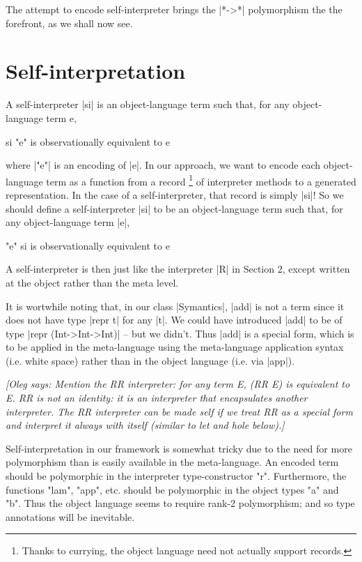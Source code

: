 \documentclass[preprint]{sigplanconf}
\newcommand{\oleg}[1]{{\it [Oleg says: #1]}}
\begin{document}
The attempt to encode self-interpreter brings the |*->*| polymorphism
the the forefront, as we shall now see.

\section{Self-interpretation}\label{selfinterp}

A self-interpreter |si| is an
object-language term such that, for any object-language term e,

\begin{code}
  si "e"    is observationally equivalent to    e
\end{code}

where |"e"| is an encoding of |e|.  In our approach, we want to encode
each object-language term as a function from a record%
\footnote{Thanks to currying, the object language need not actually support
records.}  of interpreter methods to a generated representation.  
In the case of a self-interpreter, that
record is simply |si|!  So we should define a self-interpreter |si| to be an
object-language term such that, for any object-language term |e|,

\begin{code}
  "e" si    is observationally equivalent to    e
\end{code}

A self-interpreter is then just like the interpreter
|R| in Section 2, except written at the object rather than the meta level.

It is wortwhile noting that, in our class |Symantics|, |add|
is not a term since it does not have type |repr t| for any |t|. We could
have introduced |add| to be of type |repr (Int->Int->Int)| -- but we
didn't. Thus |add| is a special form, which is to be applied in the
meta-language using the meta-language application syntax (i.e. white
space) rather than in the object language (i.e. via |app|). 

\oleg{Mention the RR interpreter: for any term E, (RR E) is equivalent to E.
RR is not an identity: it is an interpreter that encapsulates another
interpreter. The RR interpreter can be made self if we treat RR as a
special form and interpret it always with itself (similar to let and
hole below).}

Self-interpretation in our framework is somewhat
tricky due to the need for more polymorphism than is easily available
in the meta-language.  An encoded term should
be polymorphic in the interpreter type-constructor "r".  Furthermore, the
functions "lam", "app", etc. should be polymorphic in the object
types "a" and "b".  Thus the object language seems to require rank-2
polymorphism; and so type annotations will be inevitable.
\end{document}

